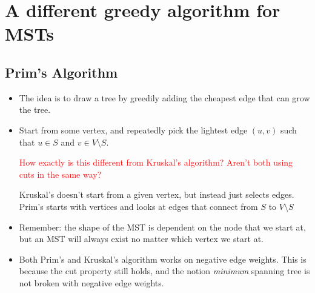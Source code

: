 \documentclass[10pt]{article}
\newcommand{\question}[1]{\textcolor{red}{#1}}
\newcommand{\answer}[1]{\textcolor{green!80!black!}{#1}}
\begin{document}
	\section{A different greedy algorithm for MSTs}
	
	\subsection{Prim's Algorithm}
	\begin{itemize}
		\item The idea is to draw a tree by greedily adding the cheapest edge that can grow the tree.
		\item Start from some vertex, and repeatedly pick the lightest edge $(u, v)$ such that 
			$u \in S$ and $v \in V \setminus S$. 

			\question{How exactly is this different from Kruskal's algorithm? Aren't both using cuts in 
			the same way?}

			\answer{Kruskal's doesn't start from a given vertex, but instead just selects edges. Prim's 
			starts with vertices and looks at edges that connect from $S$ to $V \setminus S$}
		\item Remember: the shape of the MST is dependent on the node that we start at, but an MST will 
			always exist no matter which vertex we start at.  
		\item Both Prim's and Kruskal's algorithm works on negative edge weights. This is because the cut 
			property still holds, and the notion \textit{minimum} spanning tree is not broken with 
			negative edge weights.
	\end{itemize}
\end{document}
